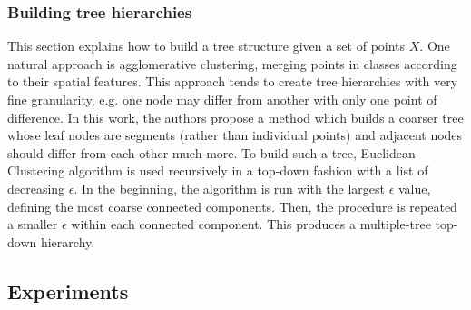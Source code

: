 \subsubsection{Building tree hierarchies}\label{header-n902}

This section explains how to build a tree structure given a set of
points $X$. One natural approach is agglomerative clustering, merging
points in classes according to their spatial features. This approach
tends to create tree hierarchies with very fine granularity, e.g. one
node may differ from another with only one point of difference. In this
work, the authors propose a method which builds a coarser tree whose
leaf nodes are segments (rather than individual points) and adjacent
nodes should differ from each other much more. To build such a tree,
Euclidean Clustering algorithm is used recursively in a top-down fashion
with a list of decreasing $\epsilon$. In the beginning, the algorithm
is run with the largest $\epsilon$ value, defining the most coarse
connected components. Then, the procedure is repeated a smaller
$\epsilon$ within each connected component. This produces a
multiple-tree top-down hierarchy.

\subsection{Experiments}\label{header-n904}

